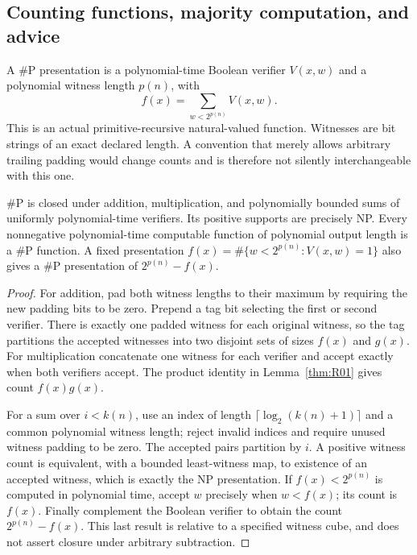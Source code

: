 \subsection{Counting functions, majority computation, and advice}

A $\#\mathrm P$ presentation is a polynomial-time Boolean verifier
$V(x,w)$ and a polynomial witness length $p(n)$, with
\[
 f(x)=\sum_{w<2^{p(n)}}V(x,w).
\]
This is an actual primitive-recursive natural-valued function. Witnesses
are bit strings of an exact declared length. A convention that merely
allows arbitrary trailing padding would change counts and is therefore
not silently interchangeable with this one.

\begin{theorem}\label{thm:R05}
$\#\mathrm P$ is closed under addition, multiplication, and polynomially
bounded sums of uniformly polynomial-time verifiers. Its positive supports
are precisely NP. Every nonnegative polynomial-time computable function
of polynomial output length is a $\#\mathrm P$ function. A fixed
presentation $f(x)=\#\{w<2^{p(n)}:V(x,w)=1\}$ also gives a
$\#\mathrm P$ presentation of $2^{p(n)}-f(x)$.
\end{theorem}
\begin{proof}
For addition, pad both witness lengths to their maximum by requiring the
new padding bits to be zero. Prepend a tag bit selecting the first or
second verifier. There is exactly one padded witness for each original
witness, so the tag partitions the accepted witnesses into two disjoint
sets of sizes $f(x)$ and $g(x)$. For multiplication concatenate one witness
for each verifier and accept exactly when both verifiers accept. The
product identity in Lemma~\ref{thm:R01} gives count $f(x)g(x)$.

For a sum over $i<k(n)$, use an index of length
$\lceil\log_2(k(n)+1)\rceil$ and a common polynomial witness length;
reject invalid indices and require unused witness padding to be zero.
The accepted pairs partition by $i$. A positive witness count is
equivalent, with a bounded least-witness map, to existence of an accepted
witness, which is exactly the NP presentation. If $f(x)<2^{p(n)}$ is
computed in polynomial time, accept $w$ precisely when $w<f(x)$; its
count is $f(x)$. Finally complement the Boolean verifier to obtain the
count $2^{p(n)}-f(x)$. This last result is relative to a specified witness
cube, and does not assert closure under arbitrary subtraction.
\end{proof}

